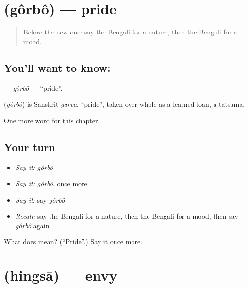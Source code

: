\section[\texorpdfstring{\bn{গর্ব} (gôrbô)}{গর্ব (gôrbô)}]{ (gôrbô) — pride}

\label{lesson:BN-C203-gorbo}



\begin{quote}
Before the new one: say the Bengali for a nature, then the Bengali for a mood.
\end{quote}

\subsection*{You'll want to know: }
\textbf{} — \emph{gôrbô} — \textquotedblleft{}pride\textquotedblright{}.

\begin{cousinweb}
\textbf{} (\emph{gôrbô}) is Sanskrit \emph{garva}, \textquotedblleft{}pride\textquotedblright{}, taken over whole as a learned loan, a tatsama.
\end{cousinweb}

\begin{grammarlens}[title={What you've built}]
One more word for this chapter.
\end{grammarlens}

\subsection*{Your turn}
\begin{itemize}
\raggedright
  \item \emph{Say it:} \emph{gôrbô}
  \item \emph{Say it:} \emph{gôrbô}, once more
  \item \emph{Say it:} say \emph{gôrbô}
  \item \emph{Recall:} say the Bengali for a nature, then the Bengali for a mood, then say \emph{gôrbô} again
\end{itemize}

\begin{tcolorbox}[breakable,colback=teal!4,colframe=teal!35!black,title={Before you move on}]
What does  mean? (\textquotedblleft{}Pride\textquotedblright{}.) Say it once more.
\end{tcolorbox}
\section[\texorpdfstring{\bn{হিংসা} (hingsā)}{হিংসা (hingsā)}]{ (hingsā) — envy}


